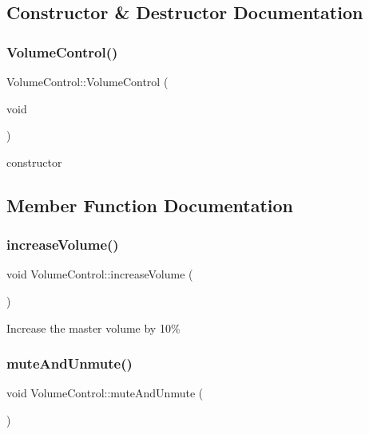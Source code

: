 \subsection{Constructor \& Destructor Documentation}
\mbox{\label{classVolumeControl_a3cc73bb232bd87f8385da0440126c38c}} 
\subsubsection{\texorpdfstring{Volume\+Control()}{VolumeControl()}}
{\footnotesize\ttfamily Volume\+Control\+::\+Volume\+Control (\begin{DoxyParamCaption}\item[{void}]{ }\end{DoxyParamCaption})}

constructor 

\subsection{Member Function Documentation}
\mbox{\label{classVolumeControl_a6b51293368c1740b9bee0b8a4e7ed421}} 
\subsubsection{\texorpdfstring{increase\+Volume()}{increaseVolume()}}
{\footnotesize\ttfamily void Volume\+Control\+::increase\+Volume (\begin{DoxyParamCaption}{ }\end{DoxyParamCaption})}

Increase the master volume by 10\% \mbox{\label{classVolumeControl_a77273bc06d0f25068045860b0c6b4f91}} 
\subsubsection{\texorpdfstring{mute\+And\+Unmute()}{muteAndUnmute()}}
{\footnotesize\ttfamily void Volume\+Control\+::mute\+And\+Unmute (\begin{DoxyParamCaption}{ }\end{DoxyParamCaption})}

